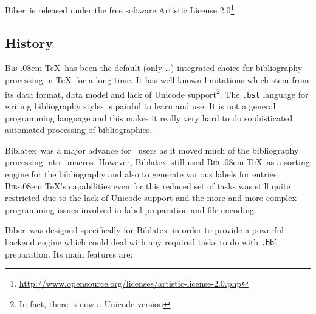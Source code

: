 \documentclass{ltxdockit}
\def\BibTeX{\textsc{Bib}\kern-.08em \TeX}
\newcommand*{\biber}{Biber\xspace}
\newcommand*{\biblatex}{Biblatex\xspace}
\begin{document}
\biber\ is released under the free software Artistic License 2.0\footnote{\url{http://www.opensource.org/licenses/artistic-license-2.0.php}}

\subsection{History}

\BibTeX\ has been the default (only \ldots) integrated choice for
bibliography processing in \TeX\ for a long time. It has well known
limitations which stem from its data format, data model and lack of Unicode
support\footnote{In fact, there is now a Unicode version}. The
\verb+.bst+ language for writing bibliography styles is painful to learn
and use. It is not a general programming language and this makes it really
very hard to do sophisticated automated processing of bibliographies.

\biblatex\ was a major advance for \latex\ users as it moved much
of the bibliography processing into \latex\ macros. However,
\biblatex\ still used \BibTeX\ as a sorting engine for the
bibliography and also to generate various labels for
entries. \BibTeX's capabilities even for this reduced set of
tasks was still quite restricted due to the lack of Unicode support and
the more and more complex programming issues involved in label
preparation and file encoding.

\biber\ was designed specifically for \biblatex\ in order to
provide a powerful backend engine which could deal with any required
tasks to do with \verb+.bbl+ preparation. Its main features are:
\end{document}
